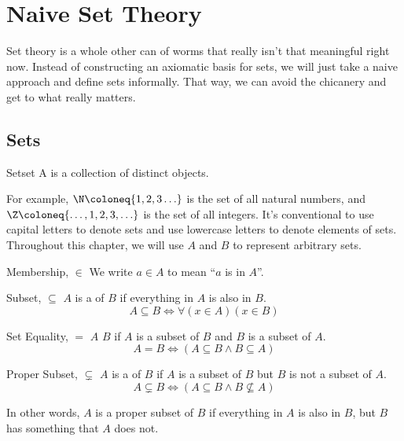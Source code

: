 \documentclass[12pt]{report}
\begin{document}
\chapter{Naive Set Theory}
Set theory is a whole other can of worms that really isn't that meaningful right now. Instead of constructing an axiomatic basis for sets, we will just take a naive approach and define sets informally. That way, we can avoid the chicanery and get to what really matters.

\section{Sets}
\begin{dfnbox}{Set}{set}
    A  is a collection of distinct objects.
\end{dfnbox}

For example, $\N \coloneq \{1,2,3\ldots\}$ is the set of all natural numbers, and $\Z \coloneq \{ \ldots, 1, 2, 3, \ldots\}$ is the set of all integers. It's conventional to use capital letters to denote sets and use lowercase letters to denote elements of sets. Throughout this
chapter, we will use $A$ and $B$ to represent arbitrary sets.

\begin{dfnbox}{Membership, $\in$}{}
    We write $a \in A$ to mean ``$a$ is in $A$''.
\end{dfnbox}

\begin{dfnbox}{Subset, $\subseteq$}{}
    $A$ is a  of $B$ if everything in $A$ is also in $B$.
    \tcblower
    \[ A \subseteq B \iff \forall(x \in A)(x \in B) \]
\end{dfnbox}

\begin{dfnbox}{Set Equality, $=$}{}
    $A$  $B$ if $A$ is a subset of $B$ and $B$ is a subset of $A$.
    \tcblower
    \[ A = B \iff (A \subseteq B \land B \subseteq A) \]
\end{dfnbox}

\begin{dfnbox}{Proper Subset, $\subsetneq$}{}
    $A$ is a  of $B$ if $A$ is a subset of $B$ but $B$ is not a subset of $A$.
    \tcblower
    \[ A \subsetneq B \iff (A \subseteq B \land B \not\subseteq A) \]
\end{dfnbox}

In other words, $A$ is a proper subset of $B$ if everything in $A$ is also in $B$, but $B$ has something that $A$ does not.
\end{document}
